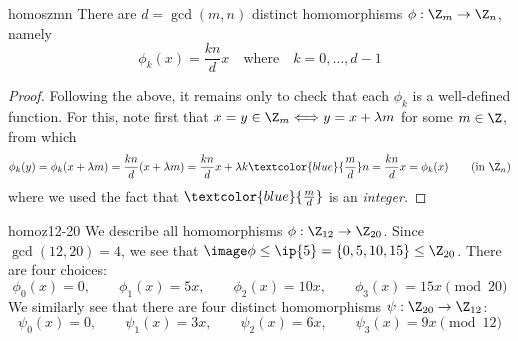 \begin{cor}{}{homoszmn}
	There are $d=\gcd(m,n)$ distinct homomorphisms $\phi:\Z_m\to\Z_n$, namely
	\[
		\phi_k(x)=\frac{kn}{d}x
		\quad\text{where}\quad 
		k=0,\ldots,d-1
	\]
\end{cor}

\begin{proof}
	Following the above, it remains only to check that each $\phi_k$ is a well-defined function. For this, note first that $x=y\in\Z_m\Longleftrightarrow y=x+\lambda m$ for some $m\in\Z$, from which
	\[
	\phi_k(y)=\phi_k(x+\lambda m)
	=\frac{kn}d(x+\lambda m) 
	=\frac{kn}dx+\lambda k\textcolor{blue}{\frac md} n
	=\frac{kn}dx =\phi_k(x)
	\tag{in $\Z_n$}
	\]
	where we used the fact that $\textcolor{blue}{\frac md}$ is an \emph{integer.}
\end{proof}


\goodbreak


\begin{example}{}{homoz12-20}
	We describe all homomorphisms $\phi:\Z_{12}\to\Z_{20}$.\smallbreak
	Since $\gcd(12,20)=4$, we see that $\image\phi\le\ip{5}=\{0,5,10,15\}\le\Z_{20}$. There are four choices:
	\[
		\phi_0(x)=0,\qquad 
		\phi_1(x)=5x,\qquad 
		\phi_2(x)=10x,\qquad 
		\phi_3(x)=15x\pmod{20}
	\]
	We similarly see that there are four distinct homomorphisms $\psi:\Z_{20}\to\Z_{12}$:
	\[
		\psi_0(x)=0,\qquad 
		\psi_1(x)=3x,\qquad 
		\psi_2(x)=6x,\qquad 
		\psi_3(x)=9x\pmod{12}
	\]
\end{example} 

\goodbreak

